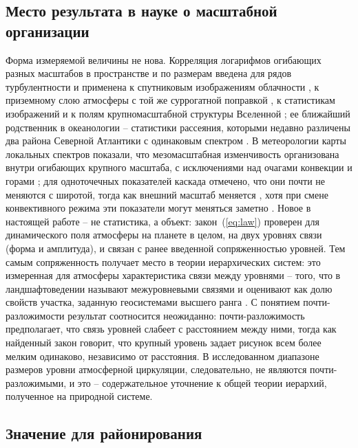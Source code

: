 \documentclass[12pt,a4paper]{article}
\begin{document}
\subsection{Место результата в науке о масштабной организации}

Форма измеряемой величины не нова. Корреляция логарифмов огибающих разных масштабов в пространстве и по размерам введена для рядов турбулентности \cite{Arneodo1998} и применена к спутниковым изображениям облачности \cite{Roux2000}, к приземному слою атмосферы с той же суррогатной поправкой \cite{Basu2007}, к статистикам изображений и к полям крупномасштабной структуры Вселенной \cite{Allys2020,Cheng2024}; ее ближайший родственник в океанологии -- статистики рассеяния, которыми недавно различены два района Северной Атлантики с одинаковым спектром \cite{Skinner2025}. В метеорологии карты локальных спектров показали, что мезомасштабная изменчивость организована внутри огибающих крупного масштаба, с исключениями над очагами конвекции и горами \cite{WangSardeshmukh2021,Kouhen2024}; для одноточечных показателей каскада отмечено, что они почти не меняются с широтой, тогда как внешний масштаб меняется \cite{Lovejoy2011}, хотя при смене конвективного режима эти показатели могут меняться заметно \cite{NogueiraBarros2014}. Новое в настоящей работе -- не статистика, а объект: закон~(\ref{eq:law}) проверен для динамического поля атмосферы на планете в целом, на двух уровнях связи (форма и амплитуда), и связан с ранее введенной сопряженностью уровней. Тем самым сопряженность получает место в теории иерархических систем: это измеренная для атмосферы характеристика связи между уровнями -- того, что в ландшафтоведении называют межуровневыми связями \cite{Khoroshev2016} и оценивают как долю свойств участка, заданную геосистемами высшего ранга \cite{Khoroshev2010}. С понятием почти-разложимости \cite{Simon1962} результат соотносится неожиданно: почти-разложимость предполагает, что связь уровней слабеет с расстоянием между ними, тогда как найденный закон говорит, что крупный уровень задает рисунок всем более мелким одинаково, независимо от расстояния. В исследованном диапазоне размеров уровни атмосферной циркуляции, следовательно, не являются почти-разложимыми, и это -- содержательное уточнение к общей теории иерархий, полученное на природной системе.

\subsection{Значение для районирования}
\end{document}
